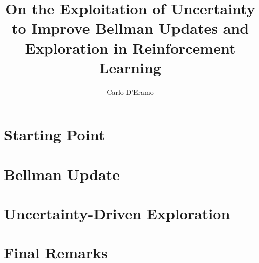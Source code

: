 \documentclass[10pt,twoside,openright,english,italian]{book}%
\author{Carlo D'Eramo}
\title{On the Exploitation of Uncertainty to Improve Bellman Updates and Exploration in Reinforcement Learning}
\begin{document}

\maketitle

\pagestyle{empty}

\cleardoublepage
\newpage

%

\cleardoublepage
\newpage

\pagestyle{fancy}
\setcounter{page}{1}



\tableofcontents
\cleardoublepage

\newpage

\listoffigures
\newpage
{}\listofalgorithms

\printglossaries

\cleardoublepage

\setcounter{page}{1}
\part{Starting Point}

\part{Bellman Update}


\part{Uncertainty-Driven Exploration}


\part{Final Remarks}



\cleardoublepage
{}
{}
\small



\appendix

\end{document}
